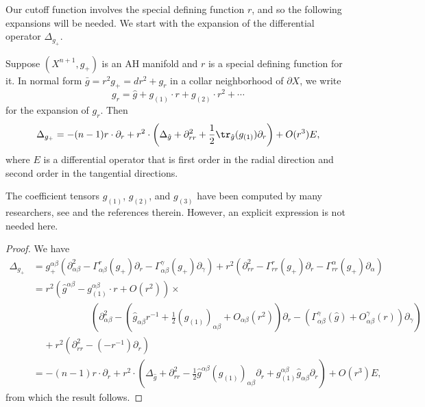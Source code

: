 \documentclass{amsart}
\newcommand{\A}{\alpha}
\newcommand{\B}{\beta}
\newcommand{\G}{\gamma}
\begin{document}
Our cutoff function involves the special defining function $r$, and so the following expansions will be needed. We start with the expansion of the differential operator $\Delta_{g_+}$.

\begin{lemma}\label{ExpansionLaplacian}
Suppose $(X^{n+1}, g_+)$ is an AH manifold and $r$ is a special defining function for it. In normal form $\bar g = r^2g_+ = dr^2 + g_r$ in a collar neighborhood of $\partial X$, we write
\begin{equation}
    g_r = \hat g + g_{(1)}\cdot r + g_{(2)}\cdot r^2 + \cdots
\end{equation}
for the expansion of $g_r$. Then 
\begin{equation}
    \Delta_{g_+} = -(n-1)r\cdot \partial_r + r^2\cdot\left(\Delta_{\hat g} + \partial^2_{rr} + \frac{1}{2}\tr_{\hat g}(g_{(1)})\partial_r\right) +  O(r^3)E,
\end{equation}
where $E$ is a differential operator that is first order in the radial direction and second order in the tangential directions.
\end{lemma}

\begin{remark}
    The coefficient tensors $g_{(1)}$, $g_{(2)}$, and $g_{(3)}$ have been computed by many researchers, see \cite{Perez-AyalaSamuel2025HaCc} and the references therein. However, an explicit expression is not needed here. 
\end{remark}

\begin{proof}
    We have 
\[
    \begin{split}
    \Delta_{g_+} &= g_+^{\A\B}(\partial^2_{\A\B} - \Gamma_{\A\B}^r(g_+)\partial_r - \Gamma_{\A\B}^\G(g_+)\partial_\G) + r^2(\partial^2_{rr} - \Gamma_{rr}^r(g_+)\partial_r - \Gamma_{rr}^\A(g_+)\partial_\A) \\ &= r^2(\hat g^{\A\B} - g_{(1)}^{\A\B}\cdot r + O(r^2))\times\\&\hspace{1in}\left(\partial^2_{\A\B} - \left(\hat g_{\A\B}r^{-1}+\frac12 (g_{(1)})_{\A\B} + O_{\A\B}(r^2)\right)\partial_r - \left(\Gamma_{\A\B}^{\G}(\hat g) + O_{\A\B}^{\G}(r)\right)\partial_\G\right) \\&\;\;\;\;+r^2(\partial^2_{rr} - (-r^{-1})\partial_r) \\ &= -(n-1)r\cdot \partial_r+ r^2\cdot\left(\Delta_{\hat g} +\partial^2_{rr} - \frac12\hat g^{\A\B}(g_{(1)})_{\A\B}\partial_r +g^{\A\B}_{(1)}\hat g_{\A\B}\partial_r\right)  +  O(r^3)E,
    \end{split}
\]  
from which the result follows. 
\end{proof}
\end{document}
